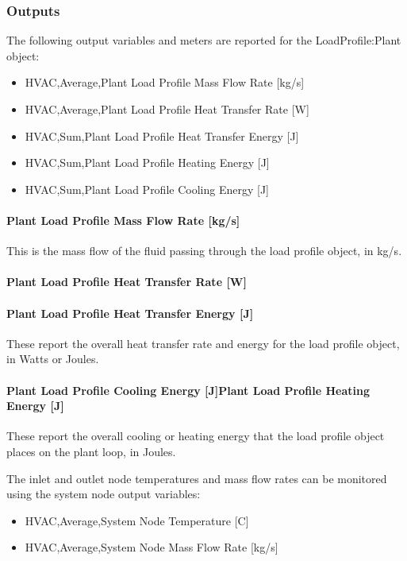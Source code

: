 \subsubsection{Outputs}\label{outputs-020}

The following output variables and meters are reported for the LoadProfile:Plant object:

\begin{itemize}
\item
  HVAC,Average,Plant Load Profile Mass Flow Rate {[}kg/s{]}
\item
  HVAC,Average,Plant Load Profile Heat Transfer Rate {[}W{]}
\item
  HVAC,Sum,Plant Load Profile Heat Transfer Energy {[}J{]}
\item
  HVAC,Sum,Plant Load Profile Heating Energy {[}J{]}
\item
  HVAC,Sum,Plant Load Profile Cooling Energy {[}J{]}
\end{itemize}

\paragraph{Plant Load Profile Mass Flow Rate {[}kg/s{]}}\label{plant-load-profile-mass-flow-rate-kgs}

This is the mass flow of the fluid passing through the load profile object, in kg/s.

\paragraph{Plant Load Profile Heat Transfer Rate {[}W{]}}\label{plant-load-profile-heat-transfer-rate-w}

\paragraph{Plant Load Profile Heat Transfer Energy {[}J{]}}\label{plant-load-profile-heat-transfer-energy-j}

These report the overall heat transfer rate and energy for the load profile object, in Watts or Joules.

\paragraph{Plant Load Profile Cooling Energy {[}J{]}Plant Load Profile Heating Energy {[}J{]}}\label{plant-load-profile-cooling-energy-jplant-load-profile-heating-energy-j}

These report the overall cooling or heating energy that the load profile object places on the plant loop, in Joules.

The inlet and outlet node temperatures and mass flow rates can be monitored using the system node output variables:

\begin{itemize}
\item
  HVAC,Average,System Node Temperature {[}C{]}
\item
  HVAC,Average,System Node Mass Flow Rate {[}kg/s{]}
\end{itemize}